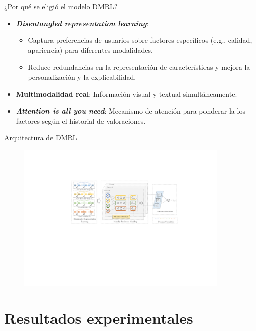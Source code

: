 \documentclass{beamer}
\begin{document}
\begin{frame}{¿Por qué se eligió el modelo DMRL?}
    \begin{itemize}
        \item \textbf{\textit{Disentangled representation learning}}: 
        \begin{itemize}
            \item Captura preferencias de usuarios sobre factores específicos (e.g., calidad, apariencia) para diferentes modalidades.
            \item Reduce redundancias en la representación de características y mejora la personalización y la explicabilidad.
        \end{itemize}
        \item \textbf{Multimodalidad real}: Información visual y textual simultáneamente.
        \item \textbf{\textit{Attention is all you need}}: Mecanismo de atención para ponderar la los factores según el historial de valoraciones.
    \end{itemize}
\end{frame}

\begin{frame}{Arquitectura de DMRL}
    \begin{figure}
        \centering
        \includegraphics[width=0.9\textwidth]{images/dmrl_arch.pdf}
    \end{figure}
\end{frame}

\section{Resultados experimentales}
\end{document}
